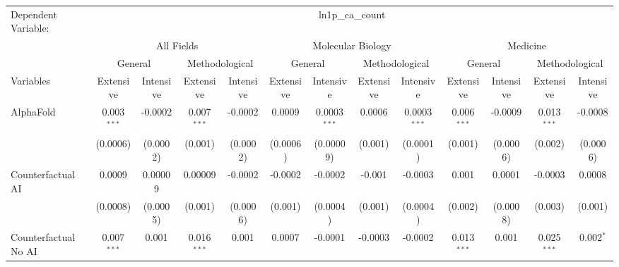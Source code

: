 \begingroup
\centering
\begin{tabular}{lcccccccccccc}
   \tabularnewline \midrule \midrule
   Dependent Variable: & \multicolumn{12}{c}{ln1p\_ca\_count}\\
 & \multicolumn{4}{c}{All Fields} & \multicolumn{4}{c}{Molecular Biology} & \multicolumn{4}{c}{Medicine} \\
\cmidrule(lr){2-5} \cmidrule(lr){6-9} \cmidrule(lr){10-13}
 & \multicolumn{2}{c}{General} & \multicolumn{2}{c}{Methodological} & \multicolumn{2}{c}{General} & \multicolumn{2}{c}{Methodological} & \multicolumn{2}{c}{General} & \multicolumn{2}{c}{Methodological} \\
\cmidrule(lr){2-3} \cmidrule(lr){4-5} \cmidrule(lr){6-7} \cmidrule(lr){8-9} \cmidrule(lr){10-11} \cmidrule(lr){12-13}
Variables & \multicolumn{1}{c}{Extensive} & \multicolumn{1}{c}{Intensive} & \multicolumn{1}{c}{Extensive} & \multicolumn{1}{c}{Intensive} & \multicolumn{1}{c}{Extensive} & \multicolumn{1}{c}{Intensive} & \multicolumn{1}{c}{Extensive} & \multicolumn{1}{c}{Intensive} & \multicolumn{1}{c}{Extensive} & \multicolumn{1}{c}{Intensive} & \multicolumn{1}{c}{Extensive} & \multicolumn{1}{c}{Intensive} \\
\cmidrule(lr){1-1}\cmidrule(lr){2-2} \cmidrule(lr){3-3} \cmidrule(lr){4-4} \cmidrule(lr){5-5} \cmidrule(lr){6-6} \cmidrule(lr){7-7} \cmidrule(lr){8-8} \cmidrule(lr){9-9} \cmidrule(lr){10-10} \cmidrule(lr){11-11} \cmidrule(lr){12-12} \cmidrule(lr){13-13}
   AlphaFold                                & 0.003$^{***}$ & -0.0002        & 0.007$^{***}$ & -0.0002         & 0.0009   & 0.0003$^{***}$ & 0.0006  & 0.0003$^{***}$ & 0.006$^{***}$ & -0.0009        & 0.013$^{***}$ & -0.0008\\   
                                            & (0.0006)      & (0.0002)       & (0.001)       & (0.0002)        & (0.0006) & (0.00009)      & (0.001) & (0.0001)       & (0.001)       & (0.0006)       & (0.002)       & (0.0006)\\   
   Counterfactual AI                        & 0.0009        & 0.00009        & 0.00009       & -0.0002         & -0.0002  & -0.0002        & -0.001  & -0.0003        & 0.001         & 0.0001         & -0.0003       & 0.0008\\   
                                            & (0.0008)      & (0.0005)       & (0.001)       & (0.0006)        & (0.001)  & (0.0004)       & (0.001) & (0.0004)       & (0.002)       & (0.0008)       & (0.003)       & (0.001)\\   
   Counterfactual No AI                     & 0.007$^{***}$ & 0.001          & 0.016$^{***}$ & 0.001           & 0.0007   & -0.0001        & -0.0003 & -0.0002        & 0.013$^{***}$ & 0.001          & 0.025$^{***}$ & 0.002$^{*}$\\   

\end{tabular}
